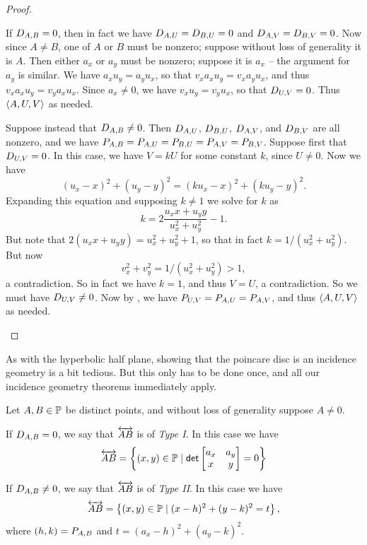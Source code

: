 \begin{proof}
\begin{itemize}
If \(D_{A,B} = 0\), then in fact we have \(D_{A,U} = D_{B,U} = 0\) and \(D_{A,V} = D_{B,V} = 0\).
Now since \(A \neq B\), one of \(A\) or \(B\) must be nonzero; suppose without loss of generality it is \(A\).
Then either \(a_x\) or \(a_y\) must be nonzero; suppose it is \(a_x\) -- the argument for \(a_y\) is similar.
We have \(a_xu_y = a_yu_x\), so that \(v_xa_xu_y = v_xa_yu_x\), and thus \(v_xa_xu_y = v_ya_xu_x\).
Since \(a_x \neq 0\), we have \(v_xu_y = v_yu_x\), so that \(D_{U,V} = 0\).
Thus \(\langle A, U, V \rangle\) as needed.

Suppose instead that \(D_{A,B} \neq 0\).
Then \(D_{A,U}\), \(D_{B,U}\), \(D_{A,V}\), and \(D_{B,V}\) are all nonzero, and we have \(P_{A,B} = P_{A,U} = P_{B,U} = P_{A,V} = P_{B,V}\).
Suppose first that \(D_{U,V} = 0\).
In this case, we have \(V = kU\) for some constant \(k\), since \(U \neq 0\).
Now we have \[ (u_x - x)^2 + (u_y - y)^2 = (ku_x - x)^2 + (ku_y - y)^2. \]
Expanding this equation and supposing \(k \neq 1\) we solve for \(k\) as \[ k = 2\frac{u_xx + u_yy}{u_x^2 + u_y^2} - 1. \]
But note that \(2(u_xx + u_yy) = u_x^2 + u_y^2 + 1\), so that in fact \(k = 1/(u_x^2 + u_y^2)\).
But now \[v_x^2 + v_y^2 = 1/(u_x^2 + u_y^2) > 1,\] a contradiction.
So in fact we have \(k = 1\), and thus \(V = U\), a contradiction.
So we must have \(D_{U,V} \neq 0\).
Now by , we have \(P_{U,V} = P_{A,U} = P_{A,V}\), and thus \(\langle A, U, V \rangle\) as needed.
\qedhere
\end{itemize}
\end{proof}

As with the hyperbolic half plane, showing that the poincare disc is an incidence geometry is a bit tedious.
But this only has to be done once, and all our incidence geometry theorems immediately apply.

\begin{prop}
Let \(A,B \in \mathbb{P}\) be distinct points, and without loss of generality suppose \(A \neq 0\).
\begin{proplist}
\item If \(D_{A,B} = 0\), we say that \(\overleftrightarrow{AB}\) is of \emph{Type I}.
In this case we have \[ \overleftrightarrow{AB} = \left\{ (x,y) \in \mathbb{P} \mid \mathsf{det} \begin{bmatrix} a_x & a_y \\ x & y \end{bmatrix} = 0 \right\} \]
\item If \(D_{A,B} \neq 0\), we say that \(\overleftrightarrow{AB}\) is of \emph{Type II}.
In this case we have \[ \overleftrightarrow{AB} = \left\{ (x,y) \in \mathbb{P} \mid (x - h)^2 + (y - k)^2 = t \right\}, \] where \((h,k) = P_{A,B}\) and \(t = (a_x - h)^2 + (a_y - k)^2\).
\end{proplist}
\end{prop}
